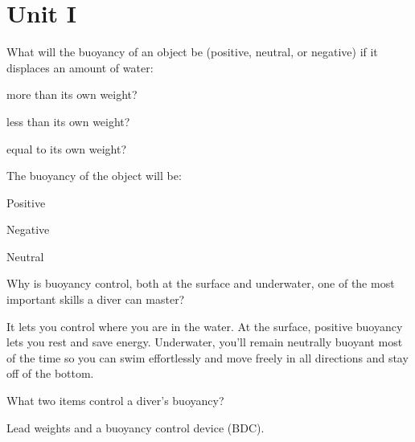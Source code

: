 	\chapter*{Unit I}

	\begin{qanda}
		\begin{question}
What will the buoyancy of an object be (positive, neutral, or negative) if it displaces an amount of water:
			\begin{nospacebulletedlist}
						\item more than its own weight?
						\item less than its own weight?
						\item equal to its own weight?
			\end{nospacebulletedlist}
		\end{question}

		\begin{answer}
The buoyancy of the object will be:
			\begin{nospacebulletedlist}
						\item Positive
						\item Negative
						\item Neutral
			\end{nospacebulletedlist}
		\end{answer}
	\end{qanda}

	\begin{qanda}
		\begin{question}
Why is buoyancy control, both at the surface and underwater, one of the most important skills a diver can master?
		\end{question}

		\begin{answer}
It lets you control where you are in the water.  At the surface, positive buoyancy lets you rest and save energy.  Underwater, you'll remain neutrally buoyant most of the time so you can swim effortlessly and move freely in all directions and stay off of the bottom.
		\end{answer}
	\end{qanda}

	\begin{qanda}
		\begin{question}
What two items control a diver's buoyancy?
		\end{question}

		\begin{answer}
Lead weights and a buoyancy control device (BDC).
		\end{answer}
	\end{qanda}

